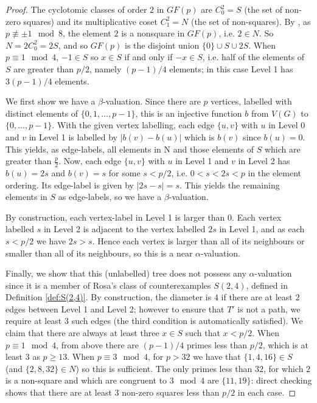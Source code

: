\documentclass[12pt, a4paper]{article}
\theoremstyle{definition}
\begin{document}
\begin{proof}
The cyclotomic classes of order $2$ in $GF(p)$ are $C_0^2=S$ (the set of non-zero squares) and its multiplicative coset $C_1^2=N$ (the set of non-squares). By \cite{Storer}, as $p \not \equiv \pm 1 \mod 8 $, the element $2$ is a nonsquare in $GF(p)$, i.e. $2 \in N$. So $N=2C_0^2=2S$, and so $GF(p)$ is the disjoint union $\{0\} \cup S \cup 2S$.  When $p \equiv 1 \mod 4$, $-1 \in S$ so $x \in S$ if and only if $-x \in S$, i.e. half of the elements of $S$ are greater than $p/2$, namely $(p-1)/4$ elements; in this case Level 1 has $3(p-1)/4$ elements.  

We first show we have a $\beta$-valuation.  Since there are $p$ vertices, labelled with distinct elements of $\{0,1,\ldots, p-1\}$, this is an injective function $b$ from $V(G)$ to $\{0,\ldots,p-1\}$.  With the given vertex labelling, each edge $\{u,v\}$ with $u$ in Level 0 and $v$ in Level 1 is labelled by $|b(v)-b(u)|$ which is $b(v)$ since $b(u)=0$. This yields, as edge-labels, all elements in N and those elements of $S$ which are greater than $\frac{p}{2}$. Now, each edge $\{u,v\}$ with $u$ in Level 1 and $v$ in Level 2 has $b(u)=2s$ and $b(v)=s$ for some $s<p/2$, i.e. $0<s<2s<p$ in the element ordering. Its edge-label is given by $|2s - s| = s$. This yields the remaining elements in $S$ as edge-labels, so we have a $\beta$-valuation. 

By construction, each vertex-label in Level 1 is larger than $0$. Each vertex labelled $s$ in Level 2 is adjacent to the vertex labelled $2s$ in Level 1, and as each $s < p/2$ we have $2s > s$. Hence each vertex is larger than all of its neighbours or smaller than all of its neighbours, so this is a near $\alpha$-valuation. 

Finally, we show that this (unlabelled) tree does not possess any $\alpha$-valuation since it is a member of Rosa's class of counterexamples $S(2,4)$, defined in Definition \ref{def:S(2,4)}.  By construction, the diameter is $4$ if there are at least $2$ edges between Level 1 and Level 2; however to ensure that $T'$ is not a path, we require at least $3$ such edges (the third condition is automatically satisfied).  We claim that there are always at least three $x \in S$ such that $x<p/2$.  When $p \equiv 1 \mod 4$, from above there are $(p-1)/4$ primes less than $p/2$, which is at least $3$ as $p \geq 13$.  When $p \equiv 3 \mod 4$, for $p>32$ we have that $\{1,4,16\} \in S$ (and $\{2,8,32\} \in N$) so this is sufficient.  The only primes less than $32$, for which $2$ is a non-square and which are congruent to $3 \mod 4$ are $\{11,19\}$: direct checking shows that there are at least $3$ non-zero squares less than $p/2$ in each case.
\end{proof}
\end{document}
